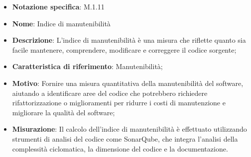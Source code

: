 \begin{itemize}
    \item \textbf{Notazione specifica}: M.1.11
    \item \textbf{Nome}: Indice di manutenibilità
    \item \textbf{Descrizione}: L'indice di manutenibilità è una misura che riflette quanto sia facile mantenere, comprendere, modificare e correggere il codice sorgente;
    \item \textbf{Caratteristica di riferimento}: Manutenibilità;
    \item \textbf{Motivo}: Fornire una misura quantitativa della manutenibilità del software, aiutando a identificare aree del codice che potrebbero richiedere rifattorizzazione o miglioramenti per ridurre i costi di manutenzione e migliorare la qualità del software;
    \item \textbf{Misurazione}: Il calcolo dell'indice di manutenibilità è effettuato utilizzando strumenti di analisi del codice come SonarQube, che integra l'analisi della complessità ciclomatica, la dimensione del codice e la documentazione.
\end{itemize}
